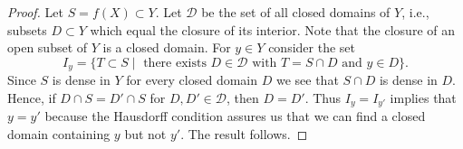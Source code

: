 \documentclass[10pt,a4paper]{amsart}
\theoremstyle{plain}
\theoremstyle{definition}
\theoremstyle{remark}
\numberwithin{equation}{subsection}
\begin{document}
\begin{proof}
Let $S = f(X) \subset Y$. Let $\mathcal{D}$ be the set of all
closed domains of $Y$, i.e., subsets $D \subset Y$ which
equal the closure of its interior. Note that the closure of an
open subset of $Y$ is a closed domain. For $y \in Y$ consider the set
$$
I_y = \{T \subset S \mid \text{ there exists }
D \in \mathcal{D}\text{ with }T = S \cap D\text{ and }y \in D\}.
$$
Since $S$ is dense in $Y$ for every closed domain $D$ we see
that $S \cap D$ is dense in $D$. Hence, if
$D \cap S = D' \cap S$ for $D, D' \in \mathcal{D}$, then
$D = D'$. Thus $I_y = I_{y'}$ implies that $y = y'$ because the
Hausdorff condition assures us that we can find a closed domain
containing $y$ but not $y'$. The result follows.
\end{proof}
\end{document}

